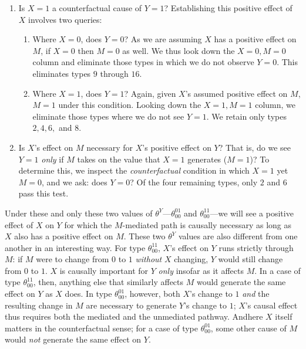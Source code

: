 \documentclass[12pt,]{book}
\begin{document}
\begin{enumerate}
\def\labelenumi{\arabic{enumi}.}
\item
  Is \(X=1\) a counterfactual cause of \(Y=1\)? Establishing this positive effect of \(X\) involves two queries:

  \begin{enumerate}
  \def\labelenumii{\alph{enumii})}
  \item
    Where \(X=0\), does \(Y=0\)? As we are assuming \(X\) has a positive effect on \(M\), if \(X=0\) then \(M=0\) as well. We thus look down the \(X=0, M=0\) column and eliminate those types in which we do not observe \(Y=0\). This eliminates types \(9\) through \(16\).
  \item
    Where \(X=1\), does \(Y=1\)? Again, given \(X\)'s assumed positive effect on \(M\), \(M=1\) under this condition. Looking down the \(X=1, M=1\) column, we eliminate those types where we do not see \(Y=1\). We retain only types \(2, 4, 6,\) and \(8\).
  \end{enumerate}
\item
  Is \(X\)'s effect on \(M\) necessary for \(X\)'s positive effect on \(Y\)? That is, do we see \(Y=1\) \emph{only} if \(M\) takes on the value that \(X=1\) generates (\(M=1\))? To determine this, we inspect the \emph{counterfactual} condition in which \(X=1\) yet \(M=0\), and we ask: does \(Y=0\)? Of the four remaining types, only \(2\) and \(6\) pass this test.
\end{enumerate}

Under these and only these two values of \(\theta^Y\)---\(\theta_{00}^{01}\) and \(\theta_{00}^{11}\)---we will see a positive effect of \(X\) on \(Y\) for which the \(M\)-mediated path is causally necessary as long as \(X\) also has a positive effect on \(M\). These two \(\theta^Y\) values are also different from one another in an interesting way. For type \(\theta_{00}^{11}\), \(X\)'s effect on \(Y\) runs strictly through \(M\): if \(M\) were to change from \(0\) to \(1\) \emph{without} \(X\) changing, \(Y\) would still change from \(0\) to \(1\). \(X\) is causally important for \(Y\) \emph{only} insofar as it affects \(M\). In a case of type \(\theta_{00}^{11}\), then, anything else that similarly affects \(M\) would generate the same effect on \(Y\) as \(X\) does. In type \(\theta_{00}^{01}\), however, both \(X\)'s change to \(1\) \emph{and} the resulting change in \(M\) are necessary to generate \(Y\)'s change to \(1\); \(X\)'s causal effect thus requires both the mediated and the unmediated pathway. Andhere \(X\) itself matters in the counterfactual sense; for a case of type \(\theta_{00}^{01}\), some other cause of \(M\) would \emph{not} generate the same effect on \(Y\).
\end{document}
